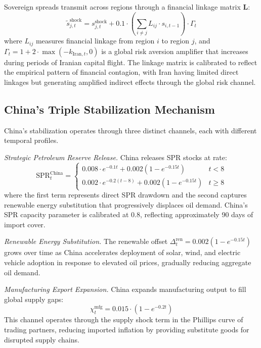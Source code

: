 \documentclass[12pt,a4paper]{article}
\begin{document}
Sovereign spreads transmit across regions through a financial linkage matrix $\mathbf{L}$:
\begin{equation}
\tilde{s}^{\text{shock}}_{j,t} = s^{\text{shock}}_{j,t} + 0.1 \cdot \left(\sum_{i \neq j} L_{ij} \cdot s_{i,t-1}\right) \cdot \Gamma_t
\label{eq:contagion}
\end{equation}
where $L_{ij}$ measures financial linkage from region $i$ to region $j$, and $\Gamma_t = 1 + 2 \cdot \max(-k_{\text{Iran},t}, 0)$ is a global risk aversion amplifier that increases during periods of Iranian capital flight. The linkage matrix is calibrated to reflect the empirical pattern of financial contagion, with Iran having limited direct linkages but generating amplified indirect effects through the global risk channel.


\subsection{China's Triple Stabilization Mechanism}

China's stabilization operates through three distinct channels, each with different temporal profiles.

\textit{Strategic Petroleum Reserve Release.} China releases SPR stocks at rate:
\begin{equation}
\text{SPR}^{\text{China}}_t = \begin{cases} 0.008 \cdot e^{-0.1t} + 0.002(1-e^{-0.15t}) & t < 8 \\ 0.002 \cdot e^{-0.2(t-8)} + 0.002(1-e^{-0.15t}) & t \geq 8 \end{cases}
\label{eq:spr}
\end{equation}
where the first term represents direct SPR drawdown and the second captures renewable energy substitution that progressively displaces oil demand. China's SPR capacity parameter is calibrated at 0.8, reflecting approximately 90 days of import cover.

\textit{Renewable Energy Substitution.} The renewable offset $\Delta^{\text{ren}}_t = 0.002(1-e^{-0.15t})$ grows over time as China accelerates deployment of solar, wind, and electric vehicle adoption in response to elevated oil prices, gradually reducing aggregate oil demand.

\textit{Manufacturing Export Expansion.} China expands manufacturing output to fill global supply gaps:
\begin{equation}
\chi^{\text{mfg}}_t = 0.015 \cdot (1 - e^{-0.2t})
\label{eq:mfg}
\end{equation}
This channel operates through the supply shock term in the Phillips curve of trading partners, reducing imported inflation by providing substitute goods for disrupted supply chains.
\end{document}
